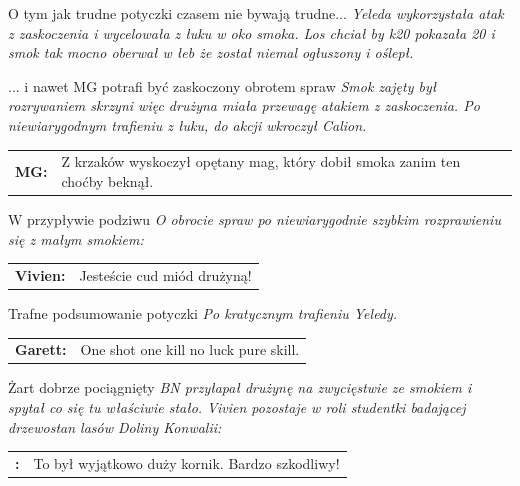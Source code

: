 \documentclass[10pt,twoside,twocolumn]{book}
\begin{document}
\begin{rpg-quotebox}{O tym jak trudne potyczki czasem nie bywają trudne...}
   \textit{Yeleda wykorzystała atak z zaskoczenia i wycelowała z łuku w oko smoka. Los chciał by k20 pokazała 20 i smok tak mocno oberwał w łeb że został niemal ogłuszony i oślepł.}
\end{rpg-quotebox}


\begin{rpg-quotebox}{... i nawet MG potrafi być zaskoczony obrotem spraw}
   \textit{Smok zajęty był rozrywaniem skrzyni więc drużyna miała przewagę atakiem z zaskoczenia. Po niewiarygodnym trafieniu z łuku, do akcji wkroczył Calion.}\\

   \begin{tabularx}{\columnwidth}{lX}
      \textbf{MG:} & Z krzaków wyskoczył opętany mag, który dobił smoka zanim ten choćby beknął.\\
   \end{tabularx}
\end{rpg-quotebox}


\begin{rpg-quotebox}{W przypływie podziwu}
   \textit{O obrocie spraw po niewiarygodnie szybkim rozprawieniu się z małym smokiem:} \\
   
   \begin{tabularx}{\columnwidth}{lX}
      \textbf{Vivien:} & Jesteście cud miód drużyną!\\
   \end{tabularx}
\end{rpg-quotebox}


\begin{rpg-quotebox}{Trafne podsumowanie potyczki}
   \textit{Po kratycznym trafieniu Yeledy.}\\

   \begin{tabularx}{\columnwidth}{lX}
      \textbf{Garett:} & One shot one kill no luck pure skill.\\
   \end{tabularx}
\end{rpg-quotebox}


\begin{rpg-quotebox}{Żart dobrze pociągnięty}
   \textit{BN przyłapał drużynę na zwycięstwie ze smokiem i spytał co się tu właściwie stało. Vivien pozostaje w roli studentki badającej drzewostan lasów Doliny Konwalii:} \\

   \begin{tabularx}{\columnwidth}{lX}
      \textbf{:} & To był wyjątkowo duży kornik. Bardzo szkodliwy!\\
   \end{tabularx}
\end{rpg-quotebox}
\end{document}
